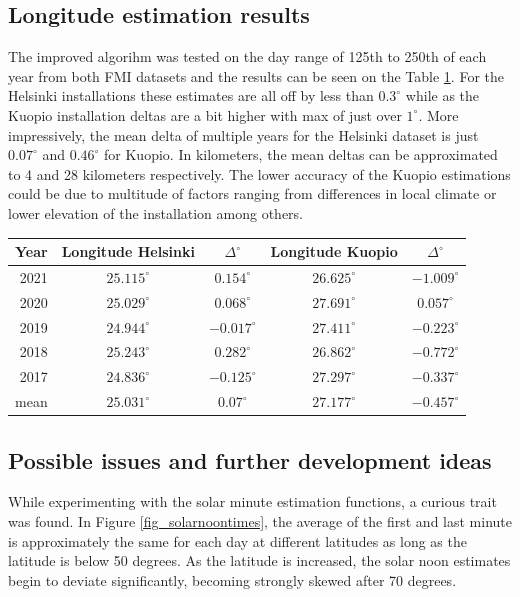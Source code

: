 \subsection{Longitude estimation results}
The improved algorihm was tested on the day range of 125th to 250th of each year from both FMI datasets and the results can be seen on the Table \ref{table_geolocator_results}. For the Helsinki installations these estimates are all off by less than $0.3^\circ$ while as the Kuopio installation deltas are a bit higher with max of just over $1^\circ$. More impressively, the mean delta of multiple years for the Helsinki dataset is just $0.07^\circ$ and $0.46^\circ$ for Kuopio. In kilometers, the mean deltas can be approximated to 4 and 28 kilometers respectively. The lower accuracy of the Kuopio estimations could be due to multitude of factors ranging from differences in local climate or lower elevation of the installation among others. 




\begin{table}[ht!]%
\centering
\begin{tabular}{r|c|c|c|c} \hline\hline

 Year & Longitude Helsinki & $\Delta^\circ$  & Longitude Kuopio & $\Delta^\circ$ \\ \hline
 2021 & $25.115^\circ$  & $0.154^\circ $  & $26.625^\circ$ & $-1.009^\circ $ \\
 2020 & $25.029^\circ$ & $0.068^\circ $& $27.691^\circ$  & $0.057^\circ $ \\
 2019 & $24.944^\circ$ & $-0.017^\circ $& $27.411^\circ$ & $-0.223^\circ $  \\
 2018 & $25.243^\circ$ & $0.282^\circ $& $26.862^\circ$ & $-0.772^\circ $ \\
 2017 & $24.836^\circ$  & $-0.125^\circ $& $27.297^\circ$ & $-0.337^\circ $ \\
 mean & $25.031^\circ$  & $0.07^\circ $& $27.177^\circ$ & $-0.457^\circ $ \\
\hline\hline
\end{tabular}
\label{table_geolocator_results}
\end{table}

\newpage
\subsection{Possible issues and further development ideas}
While experimenting with the solar minute estimation functions, a curious trait was found. In Figure \ref{fig_solarnoontimes}, the average of the first and last minute is approximately the same for each day at different latitudes as long as the latitude is below 50 degrees. As the latitude is increased, the solar noon estimates begin to deviate significantly, becoming strongly skewed after 70 degrees. 

